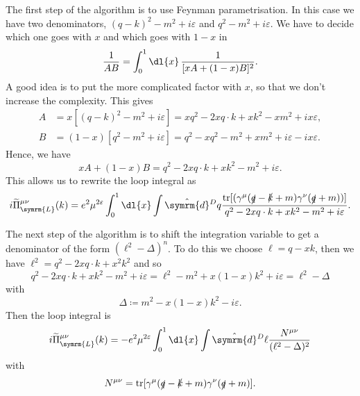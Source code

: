 \documentclass[fleqn]{NotesClass}
\newcommand{\dhat}[1]{\hat{\symrm{d}}{#1}}
\DeclareMathOperator{\tr}{tr}
\begin{document}
    The first step of the algorithm is to use Feynman parametrisation.
    In this case we have two denominators, \((q - k)^2 - m^2 + i\varepsilon\) and \(q^2 - m^2 + i\varepsilon\).
    We have to decide which one goes with \(x\) and which goes with \(1 - x\) in
    \begin{equation}
        \frac{1}{AB} = \int_0^1 \dl{x} \, \frac{1}{[xA + (1 - x)B]^2}.
    \end{equation}
    A good idea is to put the more complicated factor with \(x\), so that we don't increase the complexity.
    This gives
    \begin{align}
        A &= x[(q - k)^2 - m^2 + i\varepsilon] = xq^2 - 2xq \cdot k + xk^2 - xm^2 + ix\varepsilon,\\
        B &= (1 - x)[q^2 - m^2 + i\varepsilon] = q^2 - xq^2 - m^2 + xm^2 + i\varepsilon - ix\varepsilon.
    \end{align}
    Hence, we have
    \begin{equation}
        xA + (1 - x)B = q^2 - 2xq \cdot k + xk^2 - m^2 + i\varepsilon.
    \end{equation}
    This allows us to rewrite the loop integral as
    \begin{equation}
        i\widetilde{\Pi}^{\mu\nu}_{\symrm{L}}(k) = e^2 \mu^{2\varepsilon} \int_0^1 \dl{x} \int \dhat{^Dq} \frac{\tr[(\gamma^\mu(\slashed{q} - \slashed{k} + m)\gamma^\nu(\slashed{q} + m))]}{q^2 - 2xq \cdot k + xk^2 - m^2 + i\varepsilon}.
    \end{equation}
    
    The next step of the algorithm is to shift the integration variable to get a denominator of the form \((\ell^2 - \Delta)^n\).
    To do this we choose \(\ell = q - xk\), then we have \(\ell^2 = q^2 - 2xq \cdot k + x^2 k^2\) and so
    \begin{equation}
        q^2 - 2xq \cdot k + xk^2 - m^2 + i\varepsilon = \ell^2 - m^2 + x(1 - x)k^2 + i\varepsilon = \ell^2 - \Delta
    \end{equation}
    with
    \begin{equation}
        \Delta \coloneqq m^2 - x(1 - x)k^2 - i\varepsilon.
    \end{equation}
    Then the loop integral is
    \begin{equation}
        i\widetilde{\Pi}^{\mu\nu}_{\symrm{L}}(k) = -e^2\mu^{2\varepsilon} \int_0^1 \dl{x} \int \dhat{^D\ell} \frac{N^{\mu\nu}}{(\ell^2 - \Delta)^2}
    \end{equation}
    with
    \begin{equation}
        N^{\mu\nu} = \tr[\gamma^\mu(\slashed{q} - \slashed{k} + m)\gamma^\nu (\slashed{q} + m)].
    \end{equation}
    
\end{document}
